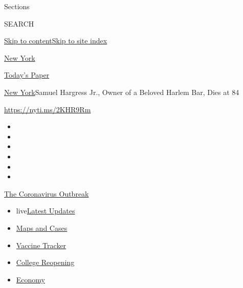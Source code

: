 Sections

SEARCH

\protect\hyperlink{site-content}{Skip to
content}\protect\hyperlink{site-index}{Skip to site index}

\href{https://www.nytimes.com/section/nyregion}{New York}

\href{https://myaccount.nytimes.com/auth/login?response_type=cookie\&client_id=vi}{}

\href{https://www.nytimes.com/section/todayspaper}{Today's Paper}

\href{/section/nyregion}{New York}\textbar{}Samuel Hargress Jr., Owner
of a Beloved Harlem Bar, Dies at 84

\url{https://nyti.ms/2KHR9Rm}

\begin{itemize}
\item
\item
\item
\item
\item
\item
\end{itemize}

\href{https://www.nytimes.com/news-event/coronavirus?action=click\&pgtype=Article\&state=default\&region=TOP_BANNER\&context=storylines_menu}{The
Coronavirus Outbreak}

\begin{itemize}
\tightlist
\item
  live\href{https://www.nytimes.com/2020/08/03/world/coronavirus-covid-19.html?action=click\&pgtype=Article\&state=default\&region=TOP_BANNER\&context=storylines_menu}{Latest
  Updates}
\item
  \href{https://www.nytimes.com/interactive/2020/us/coronavirus-us-cases.html?action=click\&pgtype=Article\&state=default\&region=TOP_BANNER\&context=storylines_menu}{Maps
  and Cases}
\item
  \href{https://www.nytimes.com/interactive/2020/science/coronavirus-vaccine-tracker.html?action=click\&pgtype=Article\&state=default\&region=TOP_BANNER\&context=storylines_menu}{Vaccine
  Tracker}
\item
  \href{https://www.nytimes.com/2020/08/02/us/covid-college-reopening.html?action=click\&pgtype=Article\&state=default\&region=TOP_BANNER\&context=storylines_menu}{College
  Reopening}
\item
  \href{https://www.nytimes.com/live/2020/08/03/business/stock-market-today-coronavirus?action=click\&pgtype=Article\&state=default\&region=TOP_BANNER\&context=storylines_menu}{Economy}
\end{itemize}

